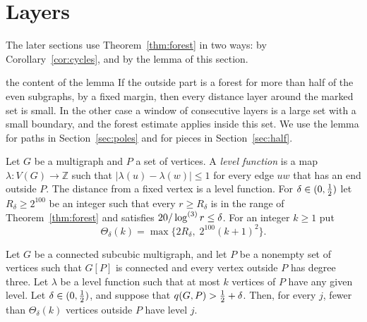 \section{Layers}\label{sec:layers}

The later sections use Theorem~\ref{thm:forest} in two ways: by Corollary~\ref{cor:cycles}, and
by the lemma of this section.

\begin{idea}{the content of the lemma}
If the outside part is a forest for more than half of the even subgraphs, by a fixed margin, then
every distance layer around the marked set is small. In the other case a window of consecutive layers is a large set
with a small boundary, and the forest estimate applies inside this set. We use the lemma for
paths in Section~\ref{sec:poles} and for pieces in Section~\ref{sec:half}.
\end{idea}

Let $G$ be a multigraph and $P$ a set of vertices. A \emph{level function} is a map
$\lambda\colon V(G)\to\mathbb{Z}$ such that $|\lambda(u)-\lambda(w)|\le1$ for every edge $uw$ that
has an end outside $P$. The distance from a fixed vertex is a level function. For
$\delta\in(0,\tfrac12)$ let $R_\delta\ge2^{100}$ be an integer such that every $r\ge R_\delta$ is in
the range of Theorem~\ref{thm:forest} and satisfies $20/\log^{(3)}r\le\delta$. For an integer $k\ge1$
put
\[
  \Theta_\delta(k)=\max\bigl\{2R_\delta,\;2^{100}(k+1)^{2}\bigr\}.
\]

\begin{lemma}[Layers]\label{lem:width}
Let $G$ be a connected subcubic multigraph, and let $P$ be a nonempty set of vertices such that
$G[P]$ is connected and every vertex outside $P$ has degree three. Let $\lambda$ be a level
function such that at most $k$ vertices of $P$ have any given level. Let $\delta\in(0,\tfrac12)$, and
suppose that $q(G,P)>\tfrac12+\delta$. Then, for every $j$, fewer than $\Theta_\delta(k)$ vertices
outside $P$ have level $j$.
\end{lemma}


